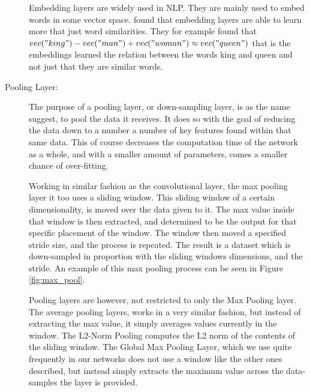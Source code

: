 \begin{description}
        Embedding layers are widely used in \gls{NLP}. They are mainly used
        to embed words in some vector space. \citet{mikolov2013linguistic}
        found that embedding layers are able to learn more that just word
        similarities. They for example found that $vec("king") - vec("man") +
        vec("woman") \approx vec("queen")$ that is the embeddings learned the
        relation between the words king and queen and not just that they are
        similar words.

    \item[Pooling Layer:]

        The purpose of a pooling layer, or down-sampling layer, is as the name
        suggest, to pool the data it receives. It does so with the goal of
        reducing the data down to a number a number of key features found within
        that same data. This of course decreases the computation time of the
        network as a whole, and with a smaller amount of parameters, comes a
        smaller chance of over-fitting.

        Working in similar fashion as the convolutional layer, the max pooling
        layer it too uses a sliding window. This sliding window of a certain
        dimensionality, is moved over the data given to it. The max value inside
        that window is then extracted, and determined to be the output for that
        specific placement of the window. The window then moved a specified
        stride size, and the process is repeated. The result is a dataset which
        is down-sampled in proportion with the sliding windows dimensions, and
        the stride. An example of this max pooling process can be seen in Figure
        \ref{fig:max_pool}.

        Pooling layers are however, not restricted to only the Max Pooling
        layer. The average pooling layers, works in a very similar fashion, but
        instead of extracting the max value, it simply averages values currently
        in the window. The L2-Norm Pooling computes the L2 norm of the contents
        of the sliding window. The Global Max Pooling Layer, which we use quite
        frequently in our networks does not use a window like the other ones
        described, but instead simply extracts the maximum value across the
        data-samples the layer is provided.


\end{description}
